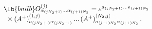 \begin{equation}
\begin{array}{l}
\lb{builb}
O_{\alpha _{\left( jN_{2}+1\right) }...
\alpha _{\left( j+1\right)
N_{2}}}^{\left( j\right) }=
\varepsilon ^{a_{\left( jN_{2}+1\right)}...
a_{\left( j+1\right) N_{2}}} \\
\mbox{ }
\times 
\left( A^{+}\right) _{a_{\left(
jN_{2}+1\right) }
\alpha _{\left( jN_{2}+1\right) }}^{\left( 1,j\right)}
...
\left( A^{+}\right) _{a_{\left( j+1\right) N_{2}}
\alpha _{\left(
j+1\right) N_{2}}}^{\left( N_{2},j\right) }.
\end{array}
\end{equation}

